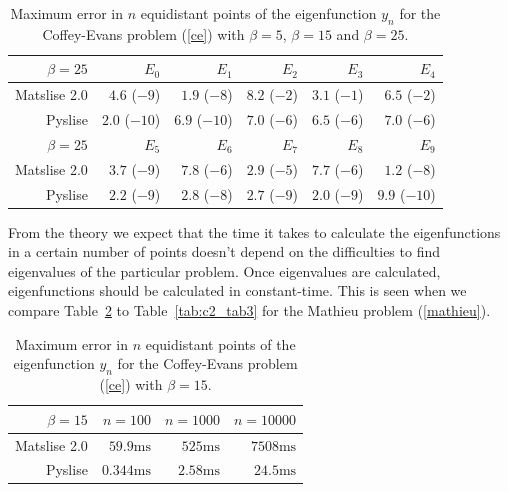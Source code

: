\begin{table}
  \begin{center}
    \begin{tabular}{rrrrrr}
      \toprule
      $\beta=25$   & $E_{0}$       & $E_{1}$       & $E_{2}$      & $E_{3}$      & $E_{4}$       \\
      \midrule
      Matslise 2.0 & $4.6$ ($-9$)  & $1.9$ ($-8$)  & $8.2$ ($-2$) & $3.1$ ($-1$) & $6.5$ ($-2$)  \\
      Pyslise      & $2.0$ ($-10$) & $6.9$ ($-10$) & $7.0$ ($-6$) & $6.5$ ($-6$) & $7.0$ ($-6$)  \\
      \midrule
      \midrule
      $\beta=25$   & $E_{5}$       & $E_{6}$       & $E_{7}$      & $E_{8}$      & $E_{9}$       \\
      \midrule
      Matslise 2.0 & $3.7$ ($-9$)  & $7.8$ ($-6$)  & $2.9$ ($-5$) & $7.7$ ($-6$) & $1.2$ ($-8$)  \\
      Pyslise      & $2.2$ ($-9$)  & $2.8$ ($-8$)  & $2.7$ ($-9$) & $2.0$ ($-9$) & $9.9$ ($-10$) \\
      \bottomrule
    \end{tabular}
  \end{center}
  \caption{\label{tab:c2_tab5} Maximum error in $n$ equidistant points of the eigenfunction $y_n$ for the Coffey-Evans problem (\ref{ce}) with $\beta=5$, $\beta=15$ and $\beta=25$.}
\end{table}

From the theory we expect that the time it takes to calculate the eigenfunctions in a certain number of points doesn't depend on the difficulties to find eigenvalues of the particular problem. Once eigenvalues are calculated, eigenfunctions should be calculated in constant-time. This is seen when we compare Table~\ref{tab:c2_tab6} to Table~\ref{tab:c2_tab3} for the Mathieu problem (\ref{mathieu}).

\begin{table}
  \begin{center}
    \begin{tabular}{rrrr}
      \toprule
      $\beta = 15$ & $n=100$          & $n=1000$        & $n=10000$       \\
      \midrule
      Matslise 2.0 & $59.9\text{ms}$  & $525\text{ms}$  & $7508\text{ms}$ \\
      Pyslise      & $0.344\text{ms}$ & $2.58\text{ms}$ & $24.5\text{ms}$ \\
      \bottomrule
    \end{tabular}
  \end{center}
  \caption{\label{tab:c2_tab6} Maximum error in $n$ equidistant points of the eigenfunction $y_n$ for the Coffey-Evans problem (\ref{ce}) with $\beta=15$.}
\end{table}

